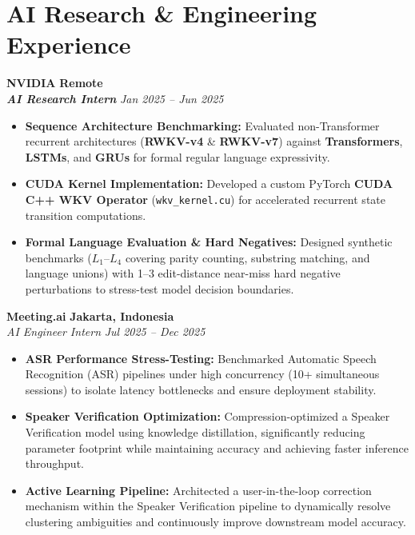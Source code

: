 \documentclass[letterpaper,10pt]{article}
\begin{document}
\section{AI Research \& Engineering Experience}
\vspace{2pt}

\noindent \textbf{\large NVIDIA} \hfill \textbf{Remote} \\
\textit{\textbf{AI Research Intern}} \hfill \textit{Jan 2025 -- Jun 2025}
\begin{itemize}
    \item \textbf{Sequence Architecture Benchmarking:} Evaluated non-Transformer recurrent architectures (\textbf{RWKV-v4} \& \textbf{RWKV-v7}) against \textbf{Transformers}, \textbf{LSTMs}, and \textbf{GRUs} for formal regular language expressivity.
    \item \textbf{CUDA Kernel Implementation:} Developed a custom PyTorch \textbf{CUDA C++ WKV Operator} (\texttt{wkv\_kernel.cu}) for accelerated recurrent state transition computations.
    \item \textbf{Formal Language Evaluation \& Hard Negatives:} Designed synthetic benchmarks ($L_1$--$L_4$ covering parity counting, substring matching, and language unions) with 1--3 edit-distance near-miss hard negative perturbations to stress-test model decision boundaries.
\end{itemize}
\vspace{3pt}

\noindent \textbf{\large Meeting.ai} \hfill \textbf{Jakarta, Indonesia} \\
\textit{AI Engineer Intern} \hfill \textit{Jul 2025 -- Dec 2025}
\begin{itemize}
    \item \textbf{ASR Performance Stress-Testing:} Benchmarked Automatic Speech Recognition (ASR) pipelines under high concurrency (10+ simultaneous sessions) to isolate latency bottlenecks and ensure deployment stability.
    \item \textbf{Speaker Verification Optimization:} Compression-optimized a Speaker Verification model using knowledge distillation, significantly reducing parameter footprint while maintaining accuracy and achieving faster inference throughput.
    \item \textbf{Active Learning Pipeline:} Architected a user-in-the-loop correction mechanism within the Speaker Verification pipeline to dynamically resolve clustering ambiguities and continuously improve downstream model accuracy.
\end{itemize}
\vspace{3pt}
\end{document}
